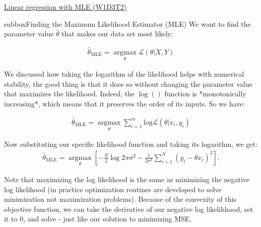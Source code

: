 \begin{textbox}{\href{https://compneuro.neuromatch.io/tutorials/W1D3_ModelFitting/student/W1D3_Tutorial2.html}{Linear regression with MLE (W1D3T2)}   }
\begin{subbox}{subbox}{Finding the Maximum Likelihood Estimator (MLE)}
\scriptsize
We want to find the parameter value $\hat\theta$ that makes our data set most likely:

\begin{align}
\hat{\theta}_{\textrm{MLE}} = \underset{\theta}{\operatorname{argmax}} \mathcal{L}(\theta|X,Y) 
\end{align}

We discussed how taking the logarithm of the likelihood helps with numerical stability, the good thing is that it does so without changing the parameter value that maximizes the likelihood. Indeed, the $\log()$ function is *monotonically increasing*, which means that it preserves the order of its inputs. So we have:

\begin{align}
\hat{\theta}_{\textrm{MLE}} = \underset{\theta}{\operatorname{argmax}} \sum_{i=1}^m \textrm{log} \mathcal{L}(\theta|x_i,y_i) 
\end{align}

Now substituting our specific likelihood function and taking its logarithm, we get:
\begin{align}
\hat{\theta}_{\textrm{MLE}} = \underset{\theta}{\operatorname{argmax}} [-\frac{N}{2} \operatorname{log} 2\pi\sigma^2 - \frac{1}{2\sigma^2}\sum_{i=1}^N (y_i-\theta x_i)^2].
\end{align}

Note that maximizing the log likelihood is the same as minimizing the negative log likelihood (in practice optimization routines are developed to solve minimization not maximization problems). Because of the convexity of this objective function, we can take the derivative of our negative log likelihhood, set it to 0, and solve - just like our solution to minimizing MSE.


\end{subbox}
\end{textbox}
